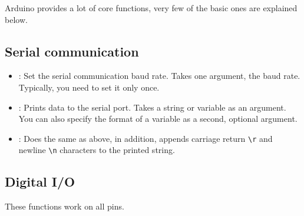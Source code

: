 \documentclass{article}
\begin{document}
	Arduino provides a lot of core functions, very few of the basic ones are explained below.

	\subsection{Serial communication}

		\begin{itemize}

			\item {}: Set the serial communication baud rate. Takes one argument, the baud rate. Typically, you need to set it only once.

			\item {}: Prints data to the serial port. Takes a string or variable as an argument. You can also specify the format of a variable as a second, optional argument.

			\item {}: Does the same as above, in addition, appends carriage return \texttt{\textbackslash{}r} and newline \texttt{\textbackslash{}n} characters to the printed string.

		\end{itemize}

	\subsection{Digital I/O}

		These functions work on all pins.
\end{document}

